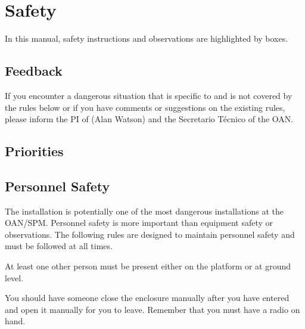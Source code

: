 \chapter{Safety}
\label{chapter:safety}


In this manual, safety instructions and observations are highlighted by boxes.
\section{Feedback}

If you encounter a dangerous situation that is specific to {\projectname} and is not covered by the rules below or if you have comments or suggestions on the existing rules, please inform the PI of {\projectname} (Alan Watson) and the Secretario Técnico of the OAN.

\section{Priorities}


\section{Personnel Safety}

The {\projectname} installation is potentially one of the most dangerous installations at the OAN/SPM. Personnel safety is more important than equipment safety or observations. The following  rules are designed to maintain personnel safety and must be followed at all times.


At least one other person must be present either on the platform or at ground level.


You should have someone close the enclosure manually after you have entered and open it manually for you to leave. Remember that you must have a radio on hand.

